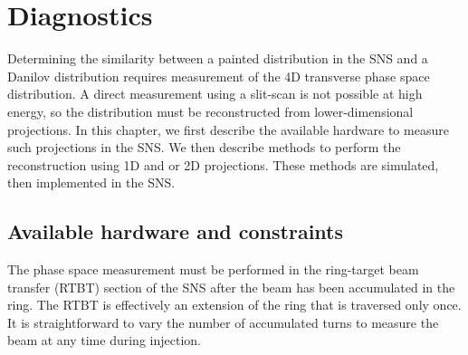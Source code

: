 \chapter{Diagnostics} \label{chap-4}

Determining the similarity between a painted distribution in the SNS and a Danilov distribution requires measurement of the 4D transverse phase space distribution. A direct measurement using a slit-scan \cite{Cathey2018} is not possible at high energy, so the distribution must be reconstructed from lower-dimensional projections. In this chapter, we first describe the available hardware to measure such projections in the SNS. We then describe methods to perform the reconstruction using 1D and or 2D projections. These methods are simulated, then implemented in the SNS.


\section{Available hardware and constraints}

The phase space measurement must be performed in the ring-target beam transfer (RTBT) section of the SNS after the beam has been accumulated in the ring. The RTBT is effectively an extension of the ring that is traversed only once. It is straightforward to vary the number of accumulated turns to measure the beam at any time during injection. 

